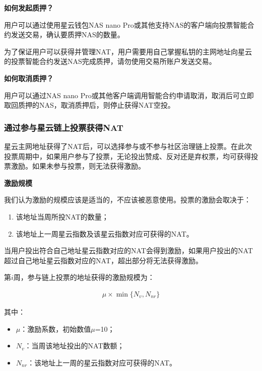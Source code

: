 \vspace{2em}

\textbf{如何发起质押？} 
	
用户可以通过使用星云钱包NAS nano Pro或其他支持NAS的客户端向投票智能合约发送交易，确认要质押NAS的数量。

为了保证用户可以获得并管理NAT，用户需要用自己掌握私钥的主网地址向星云的投票智能合约发送NAS完成质押，请勿使用交易所账户发送交易。

\vspace{2em}

\textbf{如何取消质押？}

用户可以通过NAS nano Pro或其他客户端调用智能合约申请取消，取消后可立即取回质押的NAS，取消质押后，则停止获得NAT空投。

\subsubsection{通过参与星云链上投票获得NAT}

星云主网地址获得了NAT后，可以选择参与或不参与社区治理链上投票。在此次投票周期中，如果用户参与了投票，无论投出赞成、反对还是弃权票，均可获得投票激励。如果未参与投票，则无法获得激励。

\vspace{2em}

\textbf{激励规模}

我们认为激励的规模应该是适当的，不应该被恶意使用。投票的激励会取决于：

\begin{enumerate}
	\item 该地址当周所投NAT的数量；
	\item 该地址上一周星云指数及该星云指数对应可获得的NAT。
\end{enumerate}

当用户投出符合自己地址星云指数对应的NAT会得到激励，如果用户投出的NAT超过自己地址星云指数对应的NAT，超出部分将无法获得激励。
	
第$i$周，参与链上投票的地址获得的激励规模为：

\begin{align}
\mu\times \min\{N_{v},N_{nr}\}
\end{align}

其中：

\begin{itemize}
	\item $\mu$：激励系数，初始数值$\mu$=10；
	\item $N_{v}$：当周该地址投出的NAT数额；
	\item $N_{nr}$：该地址上一周的星云指数对应可获得的NAT。
\end{itemize}

